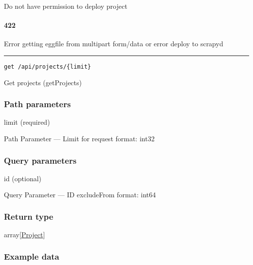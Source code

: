 Do not have permission to deploy project \protect\hyperlink{}{}

\hypertarget{section-70}{%
\paragraph{422}\label{section-70}}

Error getting eggfile from multipart form/data or error deploy to
scrapyd \protect\hyperlink{}{}

\begin{center}\rule{0.5\linewidth}{0.5pt}\end{center}

\protect\hypertarget{getProjects}{}{}



\begin{verbatim}
get /api/projects/{limit}
\end{verbatim}

Get projects ({getProjects})

\hypertarget{path-parameters-17}{%
\subsubsection*{Path parameters}\label{path-parameters-17}}

limit (required)

{Path Parameter} --- Limit for request format: int32

\hypertarget{query-parameters-3}{%
\subsubsection*{Query parameters}\label{query-parameters-3}}

id (optional)

{Query Parameter} --- ID excludeFrom format: int64

\hypertarget{return-type-20}{%
\subsubsection*{Return type}\label{return-type-20}}

array{[}\protect\hyperlink{Project}{Project}{]}

\hypertarget{example-data-20}{%
\subsubsection*{Example data}\label{example-data-20}}

